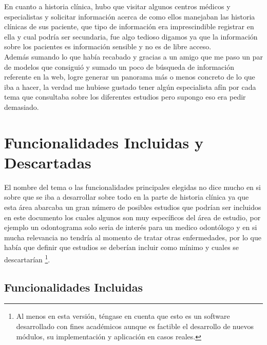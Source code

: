 En cuanto a historia clínica, hubo que visitar algunos centros médicos y especialistas  y solicitar información acerca de como ellos manejaban las historia clínicas de sus  paciente, que tipo de información era imprescindible registrar en ella y cual podría ser secundaria, fue algo tedioso digamos ya que la información sobre los pacientes es información sensible y no es de libre acceso. \\[0.1cm]

Además sumando lo que había recabado y gracias a un amigo que me paso un par de modelos que consiguió y sumado un poco de búsqueda de información referente en la web, logre generar un panorama más o menos concreto de lo que iba a hacer, la verdad me hubiese gustado tener algún especialista afín por cada tema que consultaba sobre los diferentes estudios pero supongo eso era pedir demasiado.  



\section{Funcionalidades Incluidas y Descartadas}

El nombre del tema o las funcionalidades principales elegidas no dice mucho en si sobre que se iba a desarrollar sobre todo en la parte de historia clínica ya que esta área abarcaba un gran número de posibles estudios que podrían ser incluidos en este documento los cuales algunos son muy específicos del área
de estudio, por ejemplo un odontograma solo seria de interés para un medico odontólogo y en si mucha relevancia no tendría al momento de tratar otras enfermedades, por lo que había que definir que estudios se deberían incluir como mínimo y cuales se descartarían \footnote{Al menos en esta versión, téngase en cuenta que  esto es un software desarrollado con fines académicos aunque es factible el desarrollo de nuevos módulos, su implementación y aplicación en casos reales.}.


\subsection{Funcionalidades Incluidas}

